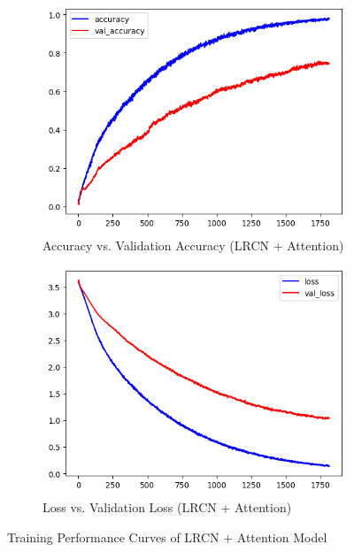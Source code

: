 \documentclass[conference]{IEEEtran}
\begin{document}
\begin{figure}[htbp]
\centering 
\begin{subfigure}[b]{0.48\linewidth} \includegraphics[width=\linewidth]{lrcn_acc.png} 
\caption{Accuracy vs. Validation Accuracy (LRCN + Attention)} 
\end{subfigure} 
\hfill 
\begin{subfigure}[b]{0.48\linewidth} \includegraphics[width=\linewidth]{lrcn_loss.png} 
\caption{Loss vs. Validation Loss (LRCN + Attention)} 
\end{subfigure} 
\caption{Training Performance Curves of LRCN + Attention Model} 
\label{fig:lrcn_training} 
\end{figure} 
\end{document}
